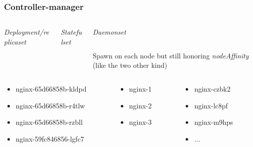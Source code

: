 \documentclass{beamer}
\begin{document}
\begin{frame}
\begin{center}
  \end{center}
\end{frame}

\begin{frame}
  \frametitle{Controller-manager}
  \begin{columns}
  \begin{column}{0.3\textwidth}
    \textit{Deployment/replicaset}
    \inputminted[fontsize=\tiny,frame=single]{yaml}{resources/deployment.yaml}
  \end{column}
  \begin{column}{0.39\textwidth}
    \textit{Statefulset}
    \inputminted[fontsize=\tiny,frame=single]{yaml}{resources/statefulset.yaml}
  \end{column}
  \begin{column}{0.3\textwidth}
    \textit{Daemonset}
    \inputminted[fontsize=\tiny,frame=single]{yaml}{resources/daemonset.yaml}
    \scriptsize{
      Spawn on each node but still honoring \textit{nodeAffinity} (like the two other kind)
    }
  \end{column}
  \end{columns}
  \begin{columns}
  \begin{column}{0.4\textwidth}
    \scriptsize{
      \begin{itemize}
        \item nginx-65d66858b-kldpd
        \item nginx-65d66858b-r4tlw
        \item nginx-65d66858b-rzbll
        \item nginx-59fc846856-lgfc7
      \end{itemize}
    }
  \end{column}
  \begin{column}{0.3\textwidth}
    \scriptsize{
      \begin{itemize}
        \item nginx-1
        \item nginx-2
        \item nginx-3
      \end{itemize}
    }
  \end{column}
  \begin{column}{0.3\textwidth}
    \scriptsize{
      \begin{itemize}
        \item nginx-czbk2
        \item nginx-lc8pf
        \item nginx-m9hps
        \item ...
      \end{itemize}
    }
  \end{column}
  \end{columns}

\end{frame}
\end{document}
